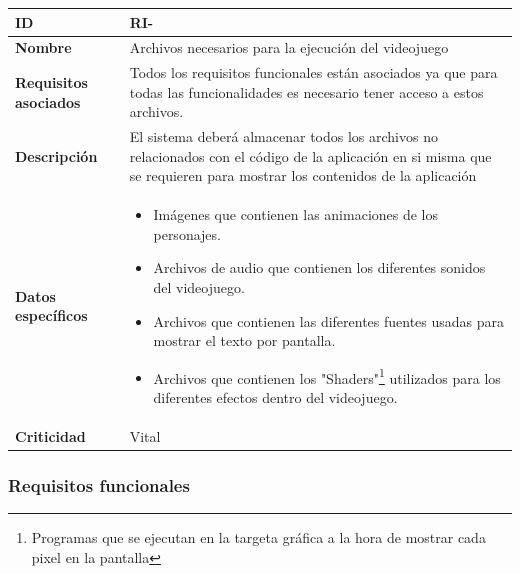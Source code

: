 \begin{center}
	\begin{tabular}{ | p{4.5cm} | p{10cm} | } 
		\hline
		
		\textbf{ID} & RI-\arabic{contador_requisitos_de_informacion}
		{contador_requisitos_de_informacion} \\
		
		\hline 
		
		\textbf{Nombre} &
		Archivos necesarios para la ejecución del videojuego\\ 
		
		\hline
		
		\textbf{Requisitos asociados} & 
		Todos los requisitos funcionales están asociados ya que para todas las funcionalidades es necesario tener acceso a estos archivos.\\
		
		\hline
		
		\textbf{Descripción} & 
		El sistema deberá almacenar todos los archivos no relacionados con el código de la aplicación en si misma que se requieren para mostrar los contenidos de la aplicación\\
		
		\hline 
		
		\textbf{Datos específicos} &
		\begin{itemize}
			\item Imágenes que contienen las animaciones de los personajes.
			\item Archivos de audio que contienen los diferentes sonidos del videojuego.
			\item Archivos que contienen las diferentes fuentes usadas para mostrar el texto por pantalla.
			\item Archivos que contienen los "Shaders"\footnote{Programas que se ejecutan en la targeta gráfica a la hora de mostrar cada pixel en la pantalla} utilizados para los diferentes efectos dentro del videojuego.
		\end{itemize}\\
		
		\hline 
		
		\textbf{Criticidad} &
		Vital\\
		
		\hline
	\end{tabular}
\end{center}



\subsubsection{Requisitos funcionales}

